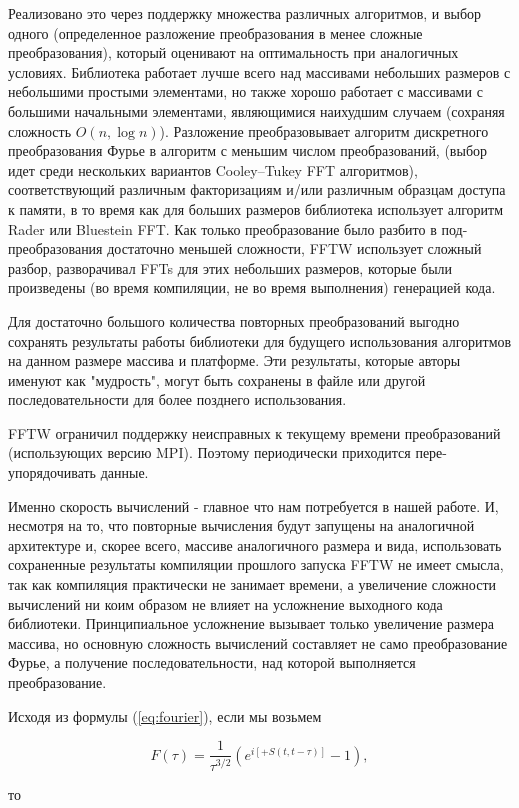 \documentclass[%
bachelor,    %
natbib,      %
subf,        %
href,        %
colorlinks,  %
]{disser}
\begin{document}
Реализовано это через поддержку множества различных алгоритмов, и выбор одного (определенное разложение преобразования в менее сложные преобразования), который оценивают на оптимальность при аналогичных условиях. Библиотека работает лучше всего над массивами небольших размеров с небольшими простыми элементами, но также хорошо работает с массивами с большими начальными элементами, являющимися наихудшим случаем (сохраняя сложность $O (n, \log n)$). Разложение преобразовывает алгоритм дискретного преобразования Фурье в алгоритм с  меньшим числом преобразований, (выбор идет среди нескольких вариантов Cooley–Tukey FFT алгоритмов), соответствующий различным факторизациям и/или различным образцам доступа к памяти, в то время как для больших размеров библиотека использует алгоритм Rader или Bluestein FFT. Как только преобразование было разбито в под-преобразования достаточно меньшей сложности, FFTW использует сложный разбор, разворачивал FFTs для этих небольших размеров, которые были произведены (во время компиляции, не во время выполнения) генерацией кода.

Для достаточно большого количества повторных преобразований выгодно сохранять результаты работы библиотеки для будущего использования алгоритмов на данном размере массива и платформе. Эти результаты, которые авторы именуют как "мудрость", могут быть сохранены в файле или другой последовательности для более позднего использования.

FFTW ограничил поддержку неисправных к текущему времени преобразований (использующих версию MPI). Поэтому периодически приходится пере-упорядочивать данные.

Именно скорость вычислений - главное что нам потребуется в нашей работе. И, несмотря на то, что повторные вычисления будут запущены на аналогичной архитектуре и, скорее всего, массиве аналогичного размера и вида, использовать сохраненные результаты компиляции прошлого запуска FFTW не имеет смысла, так как компиляция практически не занимает времени, а увеличение сложности вычислений ни коим образом не влияет на усложнение выходного кода библиотеки. Принципиальное усложнение вызывает только увеличение размера массива, но основную сложность вычислений составляет не само преобразование Фурье, а получение последовательности, над которой выполняется преобразование.

Исходя из формулы (\ref{eq:fourier}), если мы возьмем

$$ 
F(\tau) = \frac{1}{{\tau}^{3/2}}(e^{i [+ S(t, t-\tau)]} - 1),
$$

то
\end{document}
